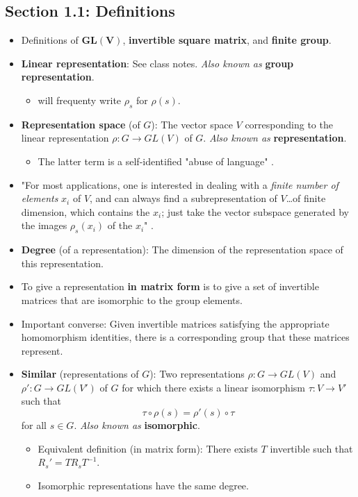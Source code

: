 \documentclass[../notes.tex]{subfiles}
\begin{document}
\subsection*{Section 1.1: Definitions}
\begin{itemize}
    \item Definitions of $\bm{GL(V)}$, \textbf{invertible square matrix}, and \textbf{finite group}.
    \item \textbf{Linear representation}: See class notes. \emph{Also known as} \textbf{group representation}.
    \begin{itemize}
        \item \textcite{bib:Serre} will frequenty write $\rho_s$ for $\rho(s)$.
    \end{itemize}
    \item \textbf{Representation space} (of $G$): The vector space $V$ corresponding to the linear representation $
    \rho:G\to GL(V)$ of $G$. \emph{Also known as} \textbf{representation}.
    \begin{itemize}
        \item The latter term is a self-identified "abuse of language" \parencite[3]{bib:Serre}.
    \end{itemize}
    \item "For most applications, one is interested in dealing with a \emph{finite number of elements} $x_i$ of $V$, and can always find a subrepresentation of $V$\dots of finite dimension, which contains the $x_i$; just take the vector subspace generated by the images $\rho_s(x_i)$ of the $x_i$" \parencite[4]{bib:Serre}.
    \item \textbf{Degree} (of a representation): The dimension of the representation space of this representation.
    \item To give a representation \textbf{in matrix form} is to give a set of invertible matrices that are isomorphic to the group elements.
    \item Important converse: Given invertible matrices satisfying the appropriate homomorphism identities, there is a corresponding group that these matrices represent.
    \item \textbf{Similar} (representations of $G$): Two representations $\rho:G\to GL(V)$ and $\rho':G\to GL(V')$ of $G$ for which there exists a linear isomorphism $\tau:V\to V'$ such that
    \begin{equation*}
        \tau\circ\rho(s) = \rho'(s)\circ\tau
    \end{equation*}
    for all $s\in G$. \emph{Also known as} \textbf{isomorphic}.
    \begin{itemize}
        \item Equivalent definition (in matrix form): There exists $T$ invertible such that $R_s'=TR_sT^{-1}$.
        \item Isomorphic representations have the same degree.
    \end{itemize}
\end{itemize}
\end{document}
